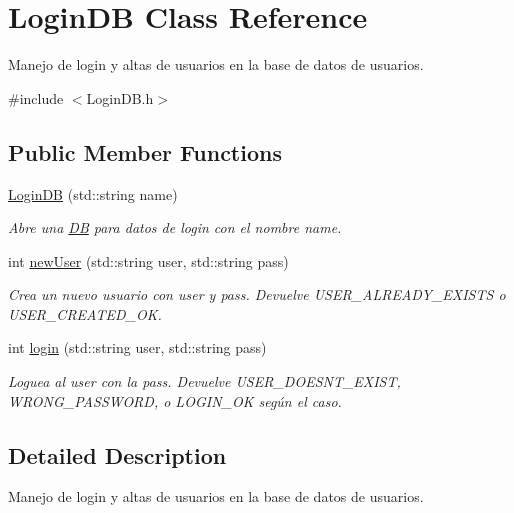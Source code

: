 \hypertarget{class_login_d_b}{}\section{Login\+D\+B Class Reference}
\label{class_login_d_b}


Manejo de login y altas de usuarios en la base de datos de usuarios.  




{\ttfamily \#include $<$Login\+D\+B.\+h$>$}

\subsection*{Public Member Functions}
\begin{DoxyCompactItemize}
\item 
\hyperlink{class_login_d_b_a99e0fa2862d63cc9d32bc268032703e1}{Login\+D\+B} (std\+::string name)
\begin{DoxyCompactList}\small\item\em Abre una \hyperlink{class_d_b}{D\+B} para datos de login con el nombre name. \end{DoxyCompactList}\item 
int \hyperlink{class_login_d_b_a21a61d8c1b921a1904f825564adee351}{new\+User} (std\+::string user, std\+::string pass)
\begin{DoxyCompactList}\small\item\em Crea un nuevo usuario con user y pass. Devuelve U\+S\+E\+R\+\_\+\+A\+L\+R\+E\+A\+D\+Y\+\_\+\+E\+X\+I\+S\+T\+S o U\+S\+E\+R\+\_\+\+C\+R\+E\+A\+T\+E\+D\+\_\+\+O\+K. \end{DoxyCompactList}\item 
int \hyperlink{class_login_d_b_aa7880fdec33f72f6aaf84101871c7800}{login} (std\+::string user, std\+::string pass)
\begin{DoxyCompactList}\small\item\em Loguea al user con la pass. Devuelve U\+S\+E\+R\+\_\+\+D\+O\+E\+S\+N\+T\+\_\+\+E\+X\+I\+S\+T, W\+R\+O\+N\+G\+\_\+\+P\+A\+S\+S\+W\+O\+R\+D, o L\+O\+G\+I\+N\+\_\+\+O\+K según el caso. \end{DoxyCompactList}\end{DoxyCompactItemize}


\subsection{Detailed Description}
Manejo de login y altas de usuarios en la base de datos de usuarios. 

